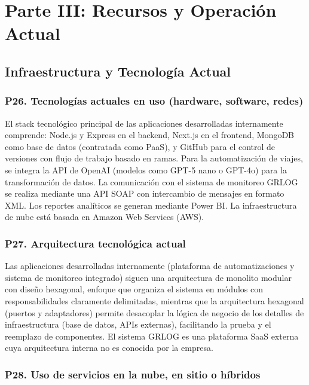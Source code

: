 \documentclass[12pt]{article}
\begin{document}
\section{Parte III: Recursos y Operaci\'on Actual}

\subsection{Infraestructura y Tecnolog\'ia Actual}

\subsubsection*{\textbf{P26. Tecnolog\'ias actuales en uso (hardware, software, redes)}}

El stack tecnol\'ogico principal de las aplicaciones desarrolladas internamente comprende:
Node.js y Express en el backend, Next.js en el frontend,
MongoDB como base de datos (contratada como PaaS), y GitHub para el
control de versiones con flujo de trabajo basado en ramas. Para la automatizaci\'on de
viajes, se integra la API de OpenAI (modelos como GPT-5 nano o GPT-4o) para la transformaci\'on
de datos. La comunicaci\'on con el sistema de monitoreo GRLOG se realiza mediante una
API SOAP con intercambio de mensajes en formato XML. Los reportes anal\'iticos
se generan mediante Power BI. La infraestructura de nube est\'a basada en
Amazon Web Services (AWS).

\subsubsection*{\textbf{P27. Arquitectura tecnol\'ogica actual}}

Las aplicaciones desarrolladas internamente (plataforma de automatizaciones y sistema de
monitoreo integrado) siguen una arquitectura de monolito modular con dise\~no
hexagonal, enfoque que organiza el sistema en m\'odulos con responsabilidades claramente
delimitadas, mientras que la arquitectura hexagonal (puertos y adaptadores) permite desacoplar
la l\'ogica de negocio de los detalles de infraestructura (base de datos, APIs externas),
facilitando la prueba y el reemplazo de componentes. El sistema GRLOG es una plataforma
SaaS externa cuya arquitectura interna no es conocida por la empresa.

\subsubsection*{\textbf{P28. Uso de servicios en la nube, en sitio o h\'ibridos}}
\end{document}
